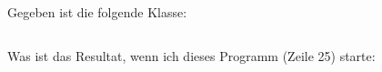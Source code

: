 \documentclass[12pt,a4paper]{exam}
\begin{document}
\begin{questions}
        \newpage
        \question[10]
        Gegeben ist die folgende Klasse:
        \inputminted[autogobble,linenos]{java}{../java/academy/calculator/InputValidator.java}

        Was ist das Resultat, wenn ich dieses Programm (Zeile 25) starte:
        \makeemptybox{\fill}

    \end{questions}
\end{document}
